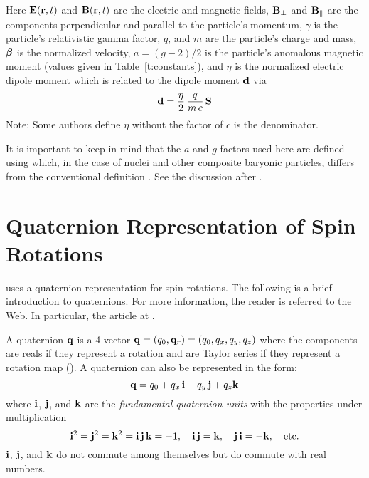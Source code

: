 Here ${\bf E} ({\bf r} ,t)$ and ${\bf B} ({\bf r} ,t)$ are the electric and magnetic fields, ${\bf B}_\perp$
and ${\bf B}_\parallel$ are the components perpendicular and parallel to the particle's momentum,
$\gamma$ is the particle's relativistic gamma factor, $q$, and $m$ are the particle's charge and
mass, $\boldsymbol{\beta}$ is the normalized velocity, $a = (g-2)/2$ is the particle's anomalous magnetic
moment (values given in Table~\ref{t:constants}), and $\eta$ is the normalized electric dipole
moment which is related to the dipole moment ${\bf d}$ via
\begin{equation}
  {\bf d} = \frac{\eta}{2} \, \frac{q}{m \, c} \, {\bf S}
\end{equation}
Note: Some authors define $\eta$ without the factor of $c$ is the denominator.

It is important to keep in mind that the $a$ and $g$-factors used here are defined using 
which, in the case of nuclei and other composite baryonic particles, differs from the conventional
definition . See the discussion after .

\section{Quaternion Representation of Spin Rotations}
\label{s:quat}

\bmad uses a quaternion representation for spin rotations. The following is a brief introduction to
quaternions. For more information, the reader is referred to the Web. In particular, the
 article at . 

A quaternion ${\bf q}$ is a 4-vector ${\bf q} = (q_0, {\bf q}_r) = (q_0, q_x, q_y, q_z)$ where the components
are reals if they represent a rotation and are Taylor series if they represent a rotation map
(). A quaternion can also be represented in the form:
\begin{equation}
  {\bf q} = q_0 + q_x \, {\bf i} + q_y \, {\bf j} + q_z {\bf k}
  \label{qqqqq}
\end{equation}
where ${\bf i}$, ${\bf j}$, and ${\bf k}$ are the {\em fundamental quaternion units} with the properties
under multiplication
\begin{equation}
  {\bf i}^2 = {\bf j}^2 = {\bf k}^2 = {\bf i} \, {\bf j} \, {\bf k} = -1, \quad 
  {\bf i} \, {\bf j} = {\bf k}, \quad {\bf j} \, {\bf i} = -{\bf k}, \quad \text{etc.}
\end{equation}
${\bf i}$, ${\bf j}$, and ${\bf k}$ do not commute among themselves but do commute with real numbers. 


